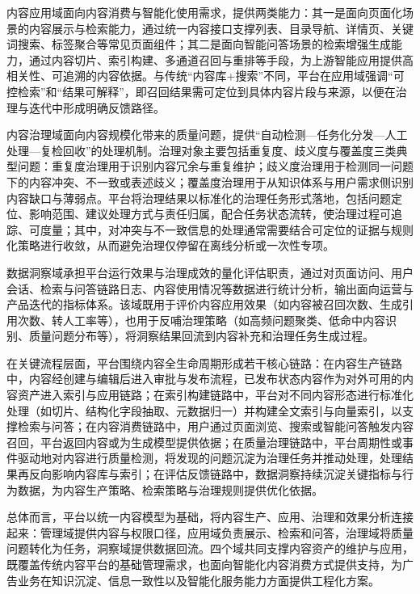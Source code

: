 内容应用域面向内容消费与智能化使用需求，提供两类能力：其一是面向页面化场景的内容展示与检索能力，通过统一内容接口支撑列表、目录导航、详情页、关键词搜索、标签聚合等常见页面组件；其二是面向智能问答场景的检索增强生成能力，通过内容切片、索引构建、多通道召回与重排等手段，为上游智能应用提供高相关性、可追溯的内容依据\cite{lewis2020retrieval,yu2024rankrag}。与传统“内容库+搜索”不同，平台在应用域强调“可控检索”和“结果可解释”，即召回结果需可定位到具体内容片段与来源，以便在治理与迭代中形成明确反馈路径。

内容治理域面向内容规模化带来的质量问题，提供“自动检测—任务化分发—人工处理—复检回收”的处理机制。治理对象主要包括重复度、歧义度与覆盖度三类典型问题：重复度治理用于识别内容冗余与重复维护；歧义度治理用于检测同一问题下的内容冲突、不一致或表述歧义；覆盖度治理用于从知识体系与用户需求侧识别内容缺口与薄弱点。平台将治理结果以标准化的治理任务形式落地，包括问题定位、影响范围、建议处理方式与责任归属，配合任务状态流转，使治理过程可追踪、可度量；其中，对冲突与不一致信息的处理通常需要结合可定位的证据与规则化策略进行收敛\cite{kulmukhametov2021improving}，从而避免治理仅停留在离线分析或一次性专项。

数据洞察域承担平台运行效果与治理成效的量化评估职责，通过对页面访问、用户会话、检索与问答链路日志、内容使用情况等数据进行统计分析，输出面向运营与产品迭代的指标体系。该域既用于评价内容应用效果（如内容被召回次数、生成引用次数、转人工率等），也用于反哺治理策略（如高频问题聚类、低命中内容识别、质量问题分布等），将洞察结果回流到内容补充和治理任务生成过程。

在关键流程层面，平台围绕内容全生命周期形成若干核心链路：在内容生产链路中，内容经创建与编辑后进入审批与发布流程，已发布状态内容作为对外可用的内容资产进入索引与应用链路；在索引构建链路中，平台对不同内容形态进行标准化处理（如切片、结构化字段抽取、元数据归一）并构建全文索引与向量索引，以支撑检索与问答；在内容消费链路中，用户通过页面浏览、搜索或智能问答触发内容召回，平台返回内容或为生成模型提供依据；在质量治理链路中，平台周期性或事件驱动地对内容进行质量检测，将发现的问题沉淀为治理任务并推动处理，处理结果再反向影响内容库与索引；在评估反馈链路中，数据洞察持续沉淀关键指标与行为数据，为内容生产策略、检索策略与治理规则提供优化依据。

总体而言，平台以统一内容模型为基础，将内容生产、应用、治理和效果分析连接起来：管理域提供内容与权限口径，应用域负责展示、检索和问答，治理域将质量问题转化为任务，洞察域提供数据回流。四个域共同支撑内容资产的维护与应用，既覆盖传统内容平台的基础管理需求，也面向智能化内容消费方式提供支持，为广告业务在知识沉淀、信息一致性以及智能化服务能力方面提供工程化方案。

